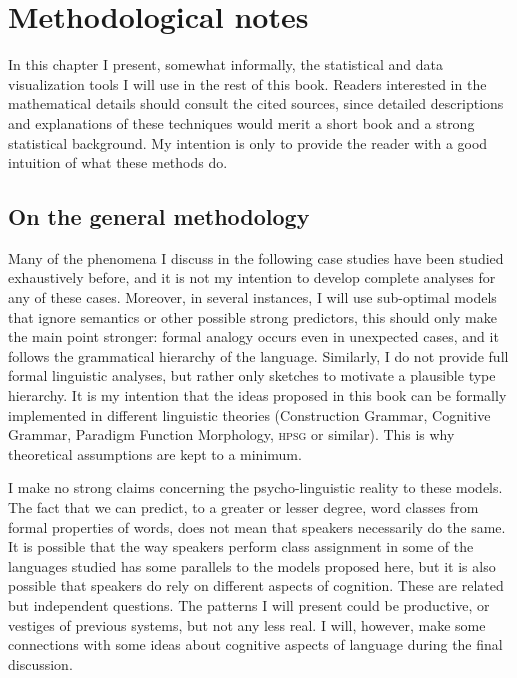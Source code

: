 \chapter{Methodological notes}\label{chap:method}

In this chapter I present, somewhat informally, the statistical and data visualization tools I will use in the rest of this book. Readers interested in the mathematical details should consult the cited sources, since detailed descriptions and explanations of these techniques would merit a short book and a strong statistical background. My intention is only to provide the reader with a good intuition of what these methods do.

\section{On the general methodology}

Many of the phenomena I discuss in the following case studies have been studied exhaustively before, and it is not my intention to develop complete analyses for any of these cases. Moreover, in several instances, I will use sub-optimal models that ignore semantics or other possible strong predictors, this should only make the main point stronger: formal analogy occurs even in unexpected cases, and it follows the grammatical hierarchy of the language. Similarly, I do not provide full formal linguistic analyses, but rather only sketches to motivate a plausible type hierarchy. It is my intention that  the ideas proposed in this book can be formally implemented in different linguistic theories (Construction Grammar, Cognitive Grammar, Paradigm Function Morphology, \textsc{hpsg} or similar). This is why theoretical assumptions are kept to a minimum.

I make no strong claims concerning the psycho-linguistic reality to these models. The fact that we can predict, to a greater or lesser degree, word classes from formal properties of words, does not mean that speakers necessarily do the same. It is possible that the way speakers perform class assignment in some of the languages studied has some parallels to the models proposed here, but it is also possible that speakers do rely on different aspects of cognition. These are related but independent questions. The patterns I will present could be productive, or vestiges of previous systems, but not any less real. I will, however, make some connections with some ideas about cognitive aspects of language during the final discussion.

